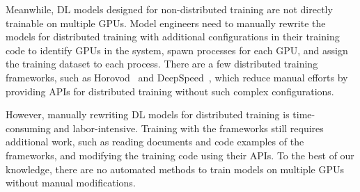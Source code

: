 Meanwhile, DL models designed for non-distributed training are not directly
trainable on multiple GPUs.
Model engineers need to manually rewrite the models for distributed training
with additional configurations in their training code to identify GPUs in the
system, spawn processes for each GPU, and assign the training dataset to each
process.
There are a few distributed training frameworks, such as
Horovod~\cite{sergeev2018horovod} and DeepSpeed~\cite{deepspeed}, which reduce
manual efforts by providing APIs for distributed training without such complex
configurations.

However, manually rewriting DL models for distributed training is
time-consuming and labor-intensive.
Training with the frameworks still requires additional work, such
as reading documents and code examples of the frameworks, and
modifying the training code using their APIs.
To the best of our knowledge, there are no automated methods to train models on
multiple GPUs without manual modifications.




